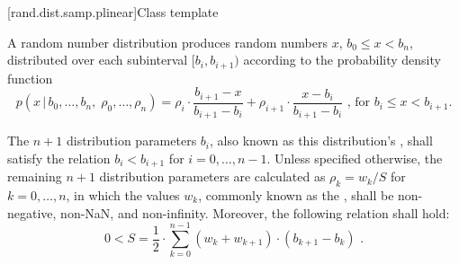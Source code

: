 [rand.dist.samp.plinear]{Class template }%
%

\pnum
A  random number distribution
produces random numbers $x$,
$b_0 \leq x < b_n$,
distributed over each subinterval
$[b_i, b_{i+1})$
according to the probability density function
\[ p(x \,|\, b_0, \dotsc, b_n, \; \rho_0, \dotsc, \rho_n)
     = \rho_{i}   \cdot {\frac{b_{i+1} - x}{b_{i+1} - b_i}}
     + \rho_{i+1} \cdot {\frac{x - b_i}{b_{i+1} - b_i}}
     \text{ , for $b_i \le x < b_{i+1}$.} \]

\pnum
The $n + 1$ distribution parameters $b_i$,
also known as this distribution's %
, shall satisfy the relation $b_i < b_{i+1}$ for $i = 0, \dotsc, n - 1$.
Unless specified otherwise,
the remaining $n + 1$ distribution parameters are calculated as
$\rho_k = {w_k / S}$ for $k = 0, \dotsc, n$, in which the values $w_k$,
commonly known as the %
, shall be non-negative, non-NaN, and non-infinity.
Moreover, the following relation shall hold:
\[ 0 < S = \frac{1}{2} \cdot \sum_{k=0}^{n-1} (w_k + w_{k+1}) \cdot (b_{k+1} - b_k) \text{ .} \]

